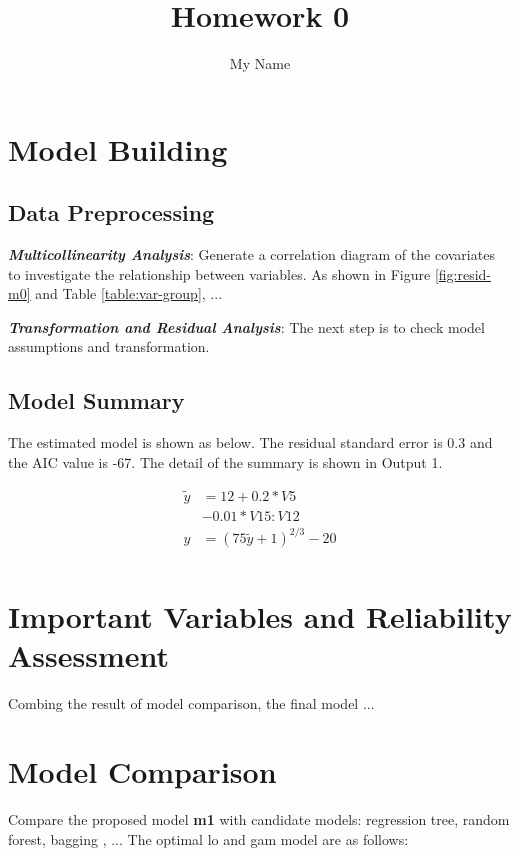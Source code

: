 \documentclass[11pt a4paper]{article}
\begin{document}
\title{Homework 0}
\author{My Name}  %
\date{\vspace{-5ex}}  %
\maketitle

\section{Model Building}

\subsection{Data Preprocessing}

\textbf{\textit{Multicollinearity Analysis}}: Generate a correlation diagram of the covariates to investigate the relationship between variables. As shown in Figure \ref{fig:resid-m0} and Table   \ref{table:var-group}, ...


\textbf{\textit{Transformation and Residual Analysis}}: The next step is to check model assumptions and transformation.



\subsection{Model Summary}
The estimated model is shown as below. The residual standard error is 0.3 and the AIC value is -67. The detail of the summary is shown in Output 1.

\begin{equation}\nonumber
\begin{aligned}
\tilde{y} &=12 + 0.2*V5\\
&- 0.01*V15:V12 \\
y &= (75\tilde{y}+1)^{2/3}-20 \\
\end{aligned}
\end{equation}






\section{Important Variables and Reliability Assessment}
Combing the result of model comparison, the final model ...


\section{Model Comparison}
Compare the proposed model \textbf{m1} with candidate models: regression tree, random forest, bagging \cite{faraway2016extending} , ... The optimal lo and gam model are as follows:

\end{document}
